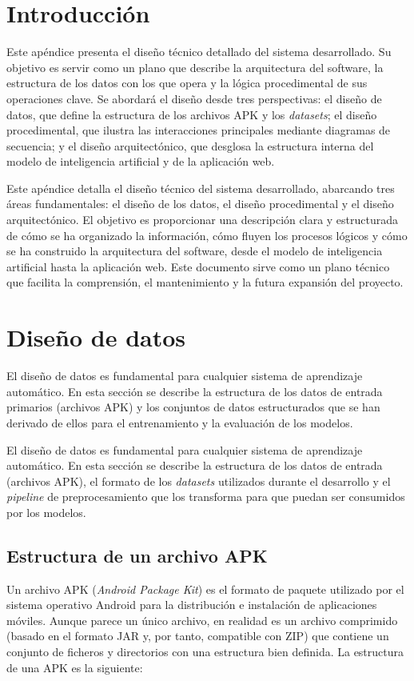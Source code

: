 \section{Introducción}
Este apéndice presenta el diseño técnico detallado del sistema desarrollado. Su objetivo es servir como un plano que describe la arquitectura del software, la estructura de los datos con los que opera y la lógica procedimental de sus operaciones clave. Se abordará el diseño desde tres perspectivas: el diseño de datos, que define la estructura de los archivos APK y los \textit{datasets}; el diseño procedimental, que ilustra las interacciones principales mediante diagramas de secuencia; y el diseño arquitectónico, que desglosa la estructura interna del modelo de inteligencia artificial y de la aplicación web.

%

Este apéndice detalla el diseño técnico del sistema desarrollado, abarcando tres áreas fundamentales: el diseño de los datos, el diseño procedimental y el diseño arquitectónico. El objetivo es proporcionar una descripción clara y estructurada de cómo se ha organizado la información, cómo fluyen los procesos lógicos y cómo se ha construido la arquitectura del software, desde el modelo de inteligencia artificial hasta la aplicación web. Este documento sirve como un plano técnico que facilita la comprensión, el mantenimiento y la futura expansión del proyecto.

\section{Diseño de datos}
El diseño de datos es fundamental para cualquier sistema de aprendizaje automático. En esta sección se describe la estructura de los datos de entrada primarios (archivos APK) y los conjuntos de datos estructurados que se han derivado de ellos para el entrenamiento y la evaluación de los modelos.

%

El diseño de datos es fundamental para cualquier sistema de aprendizaje automático. En esta sección se describe la estructura de los datos de entrada (archivos APK), el formato de los \textit{datasets} utilizados durante el desarrollo y el \textit{pipeline} de preprocesamiento que los transforma para que puedan ser consumidos por los modelos.

\subsection{Estructura de un archivo APK}
Un archivo APK (\textit{Android Package Kit}) es el formato de paquete utilizado por el sistema operativo Android para la distribución e instalación de aplicaciones móviles. Aunque parece un único archivo, en realidad es un archivo comprimido (basado en el formato JAR y, por tanto, compatible con ZIP) que contiene un conjunto de ficheros y directorios con una estructura bien definida. La estructura de una APK es la siguiente:\\

